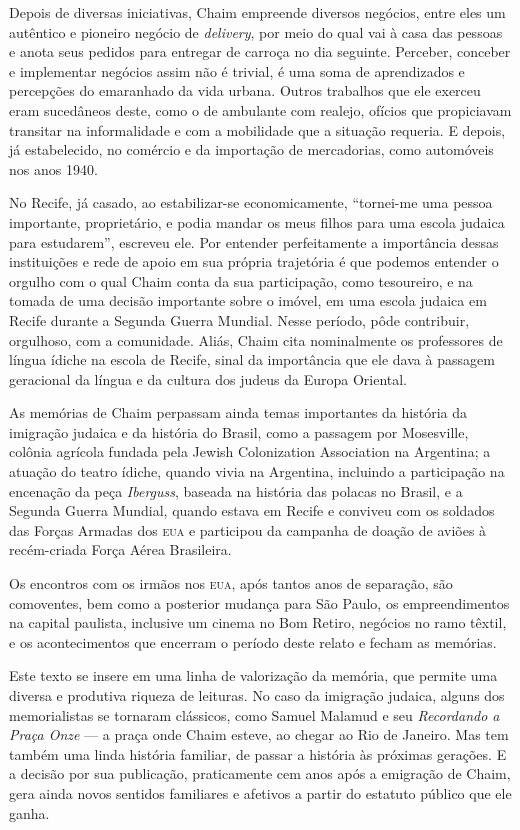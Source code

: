 Depois de diversas iniciativas, Chaim empreende diversos negócios, entre
eles um autêntico e pioneiro negócio de \textit{delivery}, por meio do qual
vai à casa das pessoas e anota seus pedidos para entregar de carroça no
dia seguinte. Perceber, conceber e implementar negócios assim não é
trivial, é uma soma de aprendizados e percepções do emaranhado da vida
urbana. Outros trabalhos que ele exerceu eram sucedâneos deste, como o
de ambulante com realejo, ofícios que propiciavam transitar na
informalidade e com a mobilidade que a situação requeria. E depois, já
estabelecido, no comércio e da importação de mercadorias, como
automóveis nos anos 1940.

No Recife, já casado, ao estabilizar-se economicamente, ``tornei-me uma
pessoa importante, proprietário, e podia mandar os meus filhos para uma
escola judaica para estudarem'', escreveu ele. Por entender
perfeitamente a importância dessas instituições e rede de apoio em sua
própria trajetória é que podemos entender o orgulho com o qual Chaim
conta da sua participação, como tesoureiro, e na tomada de uma decisão
importante sobre o imóvel, em uma escola judaica em Recife durante a
Segunda Guerra Mundial. Nesse período, pôde contribuir, orgulhoso, com a
comunidade. Aliás, Chaim cita nominalmente os professores de língua
ídiche na escola de Recife, sinal da importância que ele dava à passagem
geracional da língua e da cultura dos judeus da Europa Oriental.

As memórias de Chaim perpassam ainda temas importantes da história da
imigração judaica e da história do Brasil, como a passagem por
Mosesville, colônia agrícola fundada pela Jewish Colonization
Association na Argentina; a atuação do teatro ídiche, quando vivia na
Argentina, incluindo a participação na encenação da peça \textit{Iberguss},
baseada na história das polacas no Brasil, e a Segunda Guerra Mundial,
quando estava em Recife e conviveu com os soldados das Forças Armadas
dos \textsc{eua} e participou da campanha de doação de aviões à recém-criada
Força Aérea Brasileira.

Os encontros com os irmãos nos \textsc{eua}, após tantos anos de
separação, são comoventes, bem como a posterior mudança para São Paulo,
os empreendimentos na capital paulista, inclusive um cinema no Bom
Retiro, negócios no ramo têxtil, e os acontecimentos que encerram o
período deste relato e fecham as memórias.

Este texto se insere em uma linha de valorização da
memória, que permite uma diversa e produtiva riqueza de
leituras. No caso da imigração judaica, alguns dos memorialistas se tornaram clássicos, como
Samuel Malamud e seu \textit{Recordando a Praça Onze} --- a praça onde Chaim esteve, ao chegar
ao Rio de Janeiro. Mas tem também uma linda história familiar, de passar a história 
às próximas gerações. E a decisão por sua publicação, praticamente cem anos após a emigração de Chaim, gera ainda novos sentidos familiares e afetivos a partir do estatuto público que ele ganha.


